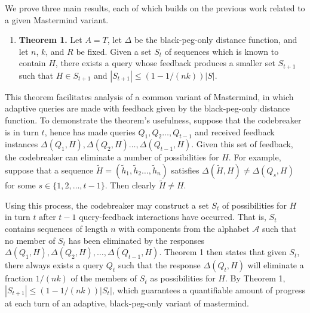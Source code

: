 \documentclass[12pt, a4paper]{article}
\begin{document}
We prove three main results, each of which builds on the previous work related to a given Mastermind variant.
\begin{enumerate}[label=]
	\item\textbf{Theorem 1.} Let $A=T$, let $\Delta$ be the black-peg-only distance function, and let $n$, $k$, and $R$ be fixed. Given a set $S_{t}$ of sequences which is known to contain $H$, there exists a query whose feedback produces a smaller set $S_{t+1}$ such that $H\in S_{t+1}$ and $|S_{t+1}|\le (1-1/(nk))|S|$.
\end{enumerate}
This theorem facilitates analysis of a common variant of Mastermind, in which adaptive queries are made with feedback given by the black-peg-only distance function. To demonstrate the theorem's usefulness, suppose that the codebreaker is in turn $t$, hence has made queries $Q_1, Q_2 \ldots, Q_{t-1}$ and received feedback instances $\Delta(Q_1, H), \Delta(Q_2, H) \ldots, \Delta(Q_{t-1},H)$. Given this set of feedback, the codebreaker can eliminate a number of possibilities for $H$. For example, suppose that a sequence $\tilde{H} = (\tilde{h}_1, \tilde{h}_2 \ldots, \tilde{h}_n)$ satisfies $\Delta(\tilde{H}, H)\neq \Delta(Q_s, H)$ for some $s\in\{1,2,\ldots, t-1\}$. Then clearly $\tilde{H}\neq H$.

Using this process, the codebreaker may construct a set $S_t$ of possibilities for $H$ in turn $t$ after $t-1$ query-feedback interactions have occurred. That is, $S_t$ contains sequences of length $n$ with components from the alphabet $\mathcal{A}$ such that no member of $S_t$ has been eliminated by the responses $\Delta(Q_1, H), \Delta(Q_2, H), \ldots, \Delta(Q_{t-1}, H)$. Theorem 1 then states that given $S_t$, there always exists a query $Q_t$ such that the response $\Delta(Q_t, H)$ will eliminate a fraction $1/(nk)$ of the members of $S_t$ as possibilities for $H$. By Theorem 1, $|S_{t+1}|\le (1-1/(nk))|S_{t}|$, which guarantees a quantifiable amount of progress at each turn of an adaptive, black-peg-only variant of mastermind.
\end{document}
